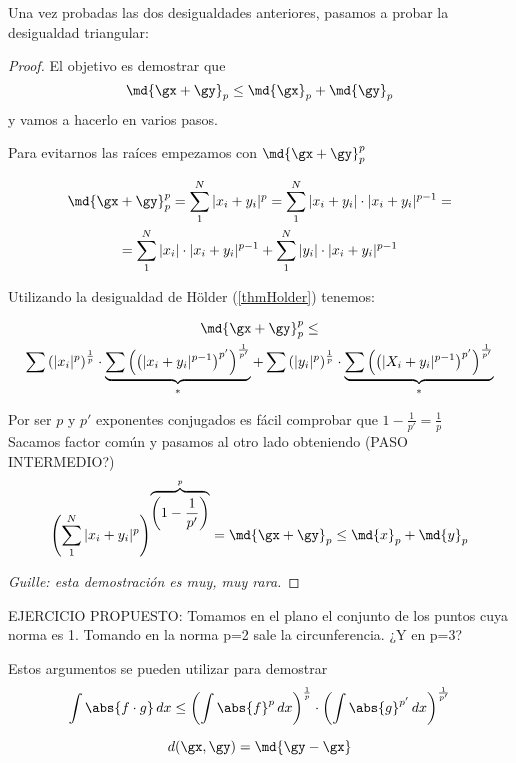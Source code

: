 \documentclass{apuntes}
\begin{document}
Una vez probadas las dos desigualdades anteriores, pasamos a probar la desigualdad triangular: 
 
\begin{proof} El objetivo es demostrar que \[ \md{\gx+\gy}_p \leq \md{\gx}_p+\md{\gy}_p \] y vamos a hacerlo en varios pasos.
 
 Para evitarnos las raíces empezamos con $\md{\gx+\gy}_p^p$

 \begin{gather*}
 \md{\gx+\gy}_p ^ p = \sum_1 ^ N |x_i+y_i| ^ p = \sum_ 1 ^ N |x_i+y_i| \cdot |x_i+y_i| ^ {p-1} =\\
 = \sum_1 ^ N |x_i|\cdot|x_i+y_i| ^ {p-1} + \sum_1^N |y_i| \cdot |x_i+y_i|^{p-1}
 \end{gather*}

 Utilizando la desigualdad de Hölder (\ref{thmHolder}) tenemos:
 
 \begin{multline*} \md{\gx+\gy}_p ^ p \leq \\
 \sum \left(|x_i|^p\right)^{\frac{1}{p}} \cdot \underbrace{\sum \left(\left(|x_i+y_i|^{p-1}\right)^{p'}\right)^{\frac{1}{p'}}}_* +
 \sum \left(|y_i|^p\right)^{\frac{1}{p}} \cdot \underbrace{\sum \left(\left(|X_i+y_i|^{p-1}\right)^{p'}\right)^{\frac{1}{p'}}}_* 
 \end{multline*}
 
 Por ser $p$ y $p'$ exponentes conjugados es fácil comprobar que $1-\frac{1}{p'} = \frac{1}{p}$\\
 Sacamos factor común y pasamos al otro lado obteniendo (PASO INTERMEDIO?)
\[ \left(\sum_1^N |x_i+y_i|^p\right)^{\overbrace{\left(1-\frac{1}{p'}\right)}^p} = \md{\gx+\gy}_p \leq \md{x}_{p} + \md{y}_{p} \]

\textit{Guille: esta demostración es muy, muy rara.}
\end{proof}


EJERCICIO PROPUESTO: Tomamos en el plano el conjunto de los puntos cuya norma es 1. Tomando en la norma p=2 sale la circunferencia. ¿Y en p=3? 


\begin{remark} Estos argumentos se pueden utilizar para demostrar
\[ \int \abs{f\cdot g}\, dx \leq \left(\int\abs{f}^p\, dx\right) ^ \frac{1}{p} \cdot \left(\int\abs{g}^{p'}\,dx\right)^\frac{1}{p'} \]
\end{remark}

\newpage


\begin{defn}
\[d(\gx,\gy) = \md{\gy - \gx} \]
\end{defn}
\end{document}
